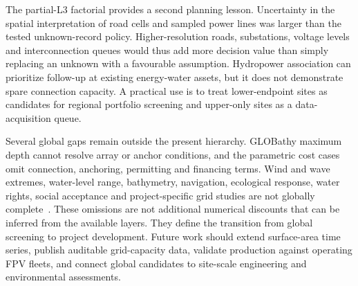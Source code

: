 The partial-L3 factorial provides a second planning lesson. Uncertainty in the spatial interpretation of road cells and sampled power lines was larger than the tested unknown-record policy. Higher-resolution roads, substations, voltage levels and interconnection queues would thus add more decision value than simply replacing an unknown with a favourable assumption. Hydropower association can prioritize follow-up at existing energy-water assets, but it does not demonstrate spare connection capacity. A practical use is to treat lower-endpoint sites as candidates for regional portfolio screening and upper-only sites as a data-acquisition queue.

Several global gaps remain outside the present hierarchy. GLOBathy maximum depth cannot resolve array or anchor conditions, and the parametric cost cases omit connection, anchoring, permitting and financing terms. Wind and wave extremes, water-level range, bathymetry, navigation, ecological response, water rights, social acceptance and project-specific grid studies are not globally complete~\citep{worldbank2019fpv}. These omissions are not additional numerical discounts that can be inferred from the available layers. They define the transition from global screening to project development. Future work should extend surface-area time series, publish auditable grid-capacity data, validate production against operating FPV fleets, and connect global candidates to site-scale engineering and environmental assessments.
